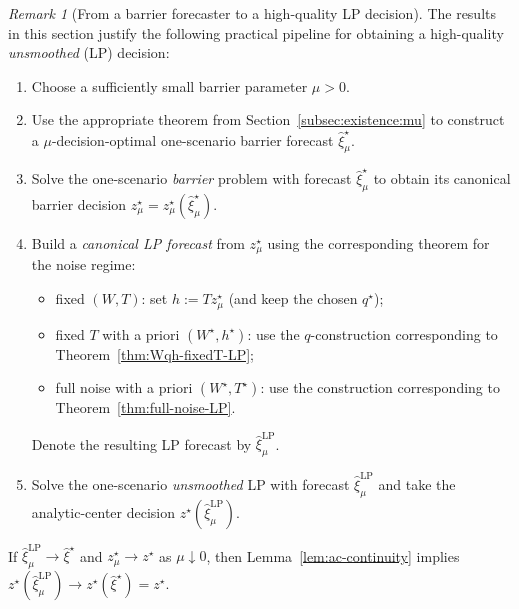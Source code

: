 \documentclass[11pt]{article}
\theoremstyle{plain}
\theoremstyle{definition}
\theoremstyle{remark}
\newtheorem{remark}[theorem]{Remark}
\begin{document}
\begin{remark}[From a barrier forecaster to a high-quality LP decision]\label{rem:procedure}
The results in this section justify the following practical pipeline for obtaining a high-quality \emph{unsmoothed} (LP) decision:
\begin{enumerate}
\item Choose a sufficiently small barrier parameter $\mu>0$.
\item Use the appropriate theorem from Section~\ref{subsec:existence:mu} to construct a $\mu$-decision-optimal
one-scenario barrier forecast $\hat\xi_\mu^\star$.
\item Solve the one-scenario \emph{barrier} problem with forecast $\hat\xi_\mu^\star$ to obtain its canonical barrier decision
$z_\mu^\star=z_\mu^\star(\hat\xi_\mu^\star)$.
\item Build a \emph{canonical LP forecast} from $z_\mu^\star$ using the corresponding theorem for the noise regime:
\begin{itemize}
\item fixed $(W,T)$: set $h:=Tz_\mu^\star$ (and keep the chosen $q^\star$);
\item fixed $T$ with a priori $(W^\star,h^\star)$: use the $q$-construction corresponding to Theorem~\ref{thm:Wqh-fixedT-LP};
\item full noise with a priori $(W^\star,T^\star)$: use the construction corresponding to Theorem~\ref{thm:full-noise-LP}.
\end{itemize}
Denote the resulting LP forecast by $\hat\xi^{\mathrm{LP}}_\mu$.
\item Solve the one-scenario \emph{unsmoothed} LP with forecast $\hat\xi^{\mathrm{LP}}_\mu$ and take the analytic-center decision
$z^\star(\hat\xi^{\mathrm{LP}}_\mu)$.
\end{enumerate}

If $\hat\xi^{\mathrm{LP}}_\mu\to \hat\xi^\star$ and $z_\mu^\star\to z^\star$ as $\mu\downarrow 0$, then
Lemma~\ref{lem:ac-continuity} implies $z^\star(\hat\xi^{\mathrm{LP}}_\mu)\to z^\star(\hat\xi^\star)=z^\star$.
\end{remark}

% 
\end{document}
